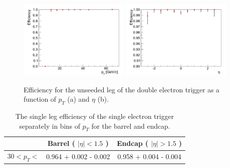 \begin{figure}[!h]
\begin{center}
\includegraphics[width=0.48\textwidth]{figures/ElectronTriggerEffVsPt_Ele17Ele8.pdf}
\includegraphics[width=0.48\textwidth]{figures/ElectronTriggerEffVsEta_Ele17Ele8.pdf}
\end{center}
\caption{Efficiency for the unseeded leg of the double electron trigger as a function of $p_{T}$ (a) and $\eta$ (b).}
\label{fig:Ele17Ele8TriggerEfficiencyUnseededLeg}
\end{figure}



\begin{table}[!ht]
\begin{center}
\begin{tabular}{|c|c|c|} \hline
              & Barrel ( $|\eta|<1.5$ )  & Endcap ( $|\eta|>1.5$ )  \\ 
\hline
30$<p_{T}<$   & 0.964 + 0.002 - 0.002 & 0.958 + 0.004 - 0.004 \\
\hline
\end{tabular}
\caption{The single leg efficiency of the single electron trigger 
separately in bins of $p_{T}$ for the barrel and endcap.
\label{tab:Ele27Efficiency}}
\end{center}
\end{table}


